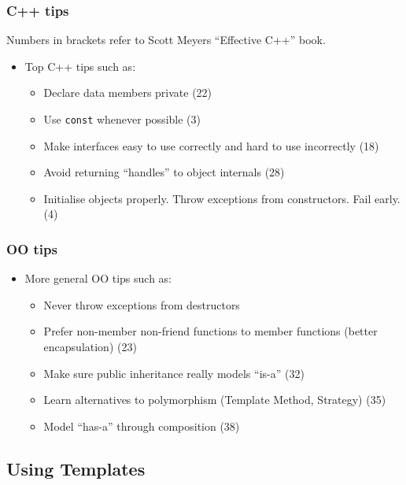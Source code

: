 \subsubsection{C++ tips}\label{c-tips}

Numbers in brackets refer to Scott Meyers ``Effective C++'' book.

\begin{itemize}
\itemsep1pt\parskip0pt
\item
  Top C++ tips such as:

  \begin{itemize}
  \itemsep1pt\parskip0pt
  \item
    Declare data members private (22)
  \item
    Use \texttt{const} whenever possible (3)
  \item
    Make interfaces easy to use correctly and hard to use incorrectly
    (18)
  \item
    Avoid returning ``handles'' to object internals (28)
  \item
    Initialise objects properly. Throw exceptions from constructors.
    Fail early. (4)
  \end{itemize}
\end{itemize}

\subsubsection{OO tips}\label{oo-tips}

\begin{itemize}
\itemsep1pt\parskip0pt
\item
  More general OO tips such as:

  \begin{itemize}
  \itemsep1pt\parskip0pt
  \item
    Never throw exceptions from destructors
  \item
    Prefer non-member non-friend functions to member functions (better
    encapsulation) (23)
  \item
    Make sure public inheritance really models ``is-a'' (32)
  \item
    Learn alternatives to polymorphism (Template Method, Strategy) (35)
  \item
    Model ``has-a'' through composition (38)
  \end{itemize}
\end{itemize}

\subsection{Using Templates}\label{using-templates}

